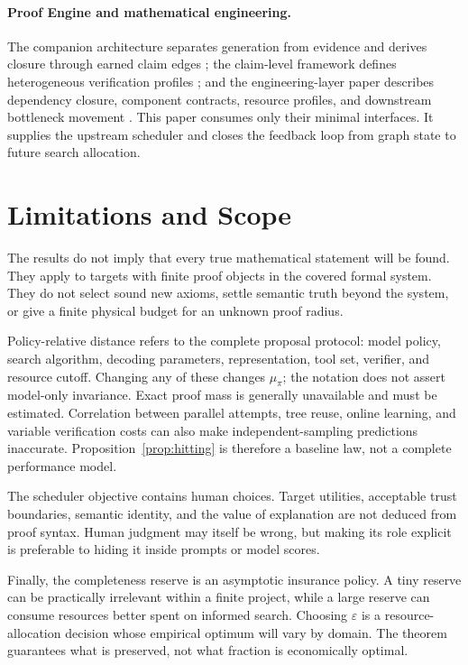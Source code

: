 \documentclass[11pt]{article}
\begin{document}
\paragraph{Proof Engine and mathematical engineering.}
The companion architecture separates generation from evidence and derives
closure through earned claim edges \citep{li2026proofengine}; the claim-level
framework defines heterogeneous verification profiles
\citep{li2026auditable}; and the engineering-layer paper describes dependency
closure, component contracts, resource profiles, and downstream bottleneck
movement \citep{li2026engineering}.  This paper consumes only their minimal
interfaces.  It supplies the upstream scheduler and closes the feedback loop
from graph state to future search allocation.

\section{Limitations and Scope}

The results do not imply that every true mathematical statement will be found.
They apply to targets with finite proof objects in the covered formal system.
They do not select sound new axioms, settle semantic truth beyond the system,
or give a finite physical budget for an unknown proof radius.

Policy-relative distance refers to the complete proposal protocol: model
policy, search algorithm, decoding parameters, representation, tool set,
verifier, and resource cutoff.  Changing any of these changes $\mu_\pi$; the
notation does not assert model-only invariance.  Exact proof mass is generally
unavailable and must be estimated.  Correlation between parallel attempts,
tree reuse, online learning, and variable verification costs can also make
independent-sampling predictions inaccurate.  Proposition~\ref{prop:hitting}
is therefore a baseline law, not a complete performance model.

The scheduler objective contains human choices.  Target utilities, acceptable
trust boundaries, semantic identity, and the value of explanation are not
deduced from proof syntax.  Human judgment may itself be wrong, but making its
role explicit is preferable to hiding it inside prompts or model scores.

Finally, the completeness reserve is an asymptotic insurance policy.  A tiny
reserve can be practically irrelevant within a finite project, while a large
reserve can consume resources better spent on informed search.  Choosing
$\varepsilon$ is a resource-allocation decision whose empirical optimum will
vary by domain.  The theorem guarantees what is preserved, not what fraction
is economically optimal.
\end{document}
